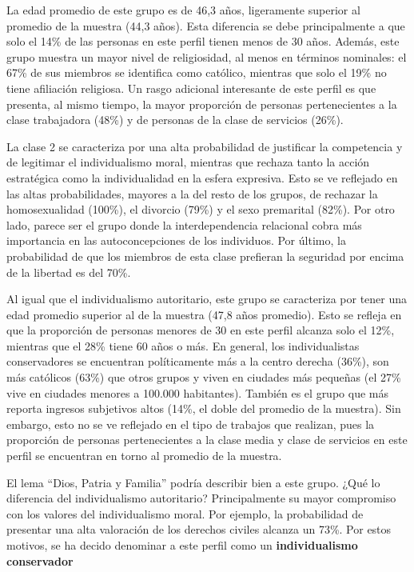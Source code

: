 \documentclass[12pt,oneside]{templates/facsothesis}
\begin{document}
La edad promedio de este grupo es de 46,3 años, ligeramente superior al promedio de la muestra (44,3 años). Esta diferencia se debe principalmente a que solo el 14\% de las personas en este perfil tienen menos de 30 años. Además, este grupo muestra un mayor nivel de religiosidad, al menos en términos nominales: el 67\% de sus miembros se identifica como católico, mientras que solo el 19\% no tiene afiliación religiosa. Un rasgo adicional interesante de este perfil es que presenta, al mismo tiempo, la mayor proporción de personas pertenecientes a la clase trabajadora (48\%) y de personas de la clase de servicios (26\%).

La clase 2 se caracteriza por una alta probabilidad de justificar la competencia y de legitimar el individualismo moral, mientras que rechaza tanto la acción estratégica como la individualidad en la esfera expresiva. Esto se ve reflejado en las altas probabilidades, mayores a la del resto de los grupos, de rechazar la homosexualidad (100\%), el divorcio (79\%) y el sexo premarital (82\%). Por otro lado, parece ser el grupo donde la interdependencia relacional cobra más importancia en las autoconcepciones de los individuos. Por último, la probabilidad de que los miembros de esta clase prefieran la seguridad por encima de la libertad es del 70\%.

Al igual que el individualismo autoritario, este grupo se caracteriza por tener una edad promedio superior al de la muestra (47,8 años promedio). Esto se refleja en que la proporción de personas menores de 30 en este perfil alcanza solo el 12\%, mientras que el 28\% tiene 60 años o más. En general, los individualistas conservadores se encuentran políticamente más a la centro derecha (36\%), son más católicos (63\%) que otros grupos y viven en ciudades más pequeñas (el 27\% vive en ciudades menores a 100.000 habitantes). También es el grupo que más reporta ingresos subjetivos altos (14\%, el doble del promedio de la muestra). Sin embargo, esto no se ve reflejado en el tipo de trabajos que realizan, pues la proporción de personas pertenecientes a la clase media y clase de servicios en este perfil se encuentran en torno al promedio de la muestra.

El lema ``Dios, Patria y Familia'' podría describir bien a este grupo. ¿Qué lo diferencia del individualismo autoritario? Principalmente su mayor compromiso con los valores del individualismo moral. Por ejemplo, la probabilidad de presentar una alta valoración de los derechos civiles alcanza un 73\%. Por estos motivos, se ha decido denominar a este perfil como un \textbf{individualismo conservador}
\end{document}
